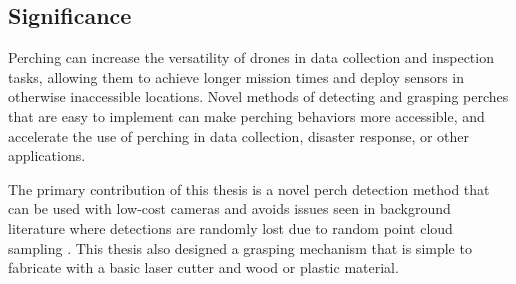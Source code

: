 \subsection{Significance}

Perching can increase the versatility of drones in data collection and inspection tasks, allowing them to achieve longer mission times
and deploy sensors in otherwise inaccessible locations. Novel methods of detecting and grasping perches that are easy to implement 
can make perching behaviors more accessible, and accelerate the use of perching in data collection, disaster response, or other applications.

The primary contribution of this thesis is a novel perch detection method that can be used with low-cost cameras and avoids issues seen in 
background literature where detections are randomly lost due to random point cloud sampling \cite{von_frankenberg_detection_2020}. This thesis 
also designed a grasping mechanism that is simple to fabricate with a basic laser cutter and wood or plastic material. 